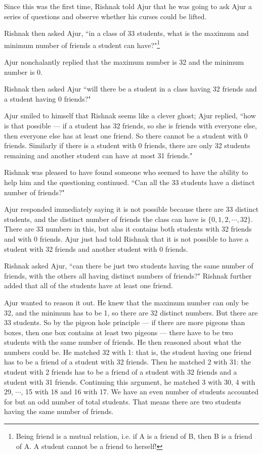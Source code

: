  Since this was the first time, Rishnak told Ajur that he was going to ask Ajur a series of questions and observe whether his curses could be lifted.
 
 Rishnak then asked Ajur, ``in a class of 33 students, what is the maximum and minimum number of friends a student can have?"\footnote{Being friend is a mutual relation, i.e. if A is a friend of B, then B is a friend of A. A student cannot be a friend to herself!}
 
 Ajur nonchalantly replied that the maximum number is 32 and the minimum number is 0.
 
 Rishnak then asked Ajur ``will there be a student in a class having 32 friends and a student having 0 friends?"
 
 Ajur smiled to himself that Rishnak seems like a clever ghost; Ajur replied, ``how is that possible --- if a student has 32 friends, so she is friends with everyone else, then everyone else has at least one friend. 
 So there cannot be a 
 student with 0 friends. Similarly if there is a student with 0 friends, there are only 32 students remaining and another student can have at most 31 friends."
 
 Rishnak was pleased to have found someone who seemed to have the ability to help him and the questioning continued. ``Can all the 33 students have a distinct number of friends?"
 
 Ajur responded immediately saying it is not possible because there are 33 distinct students, and the distinct number of friends the class can have is $\{0,1,2,\cdots,32\}$. There are 33 numbers in this, but alas it contains both students with 32 friends and with 0 friends. Ajur just had told Rishnak that it is not possible to have a student with 32 friends and another student with 0 friends.
 
 Rishnak asked Ajur, ``can there be just two students having the same number of friends, with the others all having distinct numbers of friends?" Rishnak further added that all of the students have at least one friend.
 
Ajur wanted to reason it out. He knew that the maximum number can only be 32, and the minimum has to be 1, so there are 32 distinct numbers. But there are 33 students. So by the pigeon hole principle --- if there are more pigeons than boxes, then one box contains at least two pigeons --- there have to be two students with the same number of friends.  He then reasoned about what the numbers could be. He matched 32 with 1: that is, the student having one friend has to be a friend of a student with 32 friends. Then he matched 2 with 31: the student with 2 friends has to be a friend of a student with 32 friends and a student with 31 friends. Continuing this argument, he matched 3 with 30, 4 with 29, $\cdots$, 15 with 18 and 16 with 17. We have an even number of students accounted for but an odd number of total students. That means there are two students having the same number of friends.

